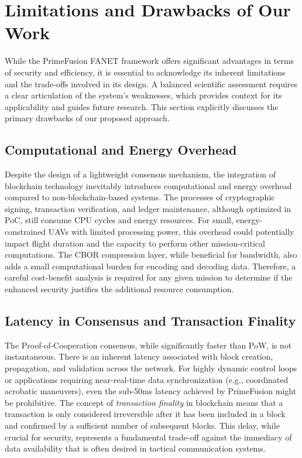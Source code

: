\section{Limitations and Drawbacks of Our Work}
\label{sec:limitations}

While the PrimeFusion FANET framework offers significant advantages in terms of security and efficiency, it is essential to acknowledge its inherent limitations and the trade-offs involved in its design. A balanced scientific assessment requires a clear articulation of the system's weaknesses, which provides context for its applicability and guides future research. This section explicitly discusses the primary drawbacks of our proposed approach.

\subsection{Computational and Energy Overhead}
Despite the design of a lightweight consensus mechanism, the integration of blockchain technology inevitably introduces computational and energy overhead compared to non-blockchain-based systems. The processes of cryptographic signing, transaction verification, and ledger maintenance, although optimized in PoC, still consume CPU cycles and energy resources. For small, energy-constrained UAVs with limited processing power, this overhead could potentially impact flight duration and the capacity to perform other mission-critical computations. The CBOR compression layer, while beneficial for bandwidth, also adds a small computational burden for encoding and decoding data. Therefore, a careful cost-benefit analysis is required for any given mission to determine if the enhanced security justifies the additional resource consumption.

\subsection{Latency in Consensus and Transaction Finality}
The Proof-of-Cooperation consensus, while significantly faster than PoW, is not instantaneous. There is an inherent latency associated with block creation, propagation, and validation across the network. For highly dynamic control loops or applications requiring near-real-time data synchronization (e.g., coordinated acrobatic maneuvers), even the sub-50ms latency achieved by PrimeFusion might be prohibitive. The concept of \textit{transaction finality} in blockchain means that a transaction is only considered irreversible after it has been included in a block and confirmed by a sufficient number of subsequent blocks. This delay, while crucial for security, represents a fundamental trade-off against the immediacy of data availability that is often desired in tactical communication systems.

